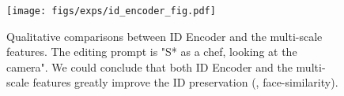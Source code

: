 \begin{figure}[t]
  \centering
  \texttt{[image: figs/exps/id\_encoder\_fig.pdf]}
  \caption{Qualitative comparisons between ID Encoder and the multi-scale features. The editing prompt is "S* as a chef, looking at the camera". We could conclude that both ID Encoder and the multi-scale features greatly improve the ID preservation (\ie, face-similarity).}
  \label{fig:id_encoder}
  \vspace{-2mm}
\end{figure}